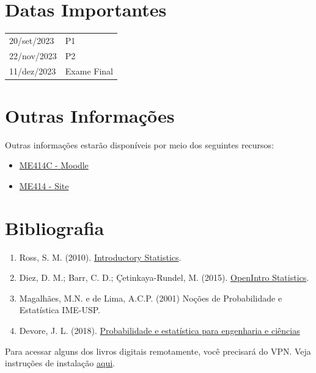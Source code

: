 \documentclass[paper=letter, fontsize=12pt]{scrartcl} %
\begin{document}
\section{Datas Importantes}

\begin{tabular}{ll}
20/set/2023  & P1 \\
22/nov/2023 & P2 \\
11/dez/2023 & Exame Final
\end{tabular}

\section{Outras Informações}

Outras informações estarão disponíveis por meio dos seguintes recursos:

\begin{itemize}
\item \href{https://moodle.ggte.unicamp.br/course/view.php?id=17204}{{\color{blue} ME414C - Moodle}}
\item \href{https://me414-unicamp.github.io}{{\color{blue} ME414 - Site}}
\end{itemize}

\section{Bibliografia}
\begin{enumerate}
\item Ross, S. M. (2010). \href{http://www.sciencedirect.com/science/book/9780123743886}{Introductory Statistics}.
\item Diez, D. M.; Barr, C. D.; Çetinkaya-Rundel, M. (2015). \href{https://leanpub.com/openintro-statistics}{OpenIntro Statistics}.
\item Magalhães, M.N. e de Lima, A.C.P. (2001) Noções de Probabilidade e Estatística IME-USP.
\item Devore, J. L. (2018). \href{http://acervus.unicamp.br/index.asp?codigo_sophia=1138563}{Probabilidade e estatística para engenharia e ciências}
\end{enumerate}


Para acessar alguns dos livros digitais remotamente, você precisará do VPN. Veja instruções de instalação \href{http://www.ccuec.unicamp.br/ccuec/acesso_remoto_vpn}{{\color{blue} aqui}}.
\end{document}
